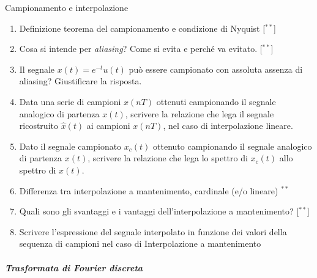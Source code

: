 \documentclass[
]{article}
\providecommand{\tightlist}{%
  \setlength{\itemsep}{0pt}\setlength{\parskip}{0pt}}
\begin{document}
Campionamento e interpolazione

\begin{enumerate}
\def\labelenumi{\arabic{enumi}.}
\setcounter{enumi}{13}
\tightlist
\item
  Definizione teorema del campionamento e condizione di Nyquist
  {[}\(^{**}\){]}
\item
  Cosa si intende per \emph{aliasing}? Come si evita e perché va
  evitato. {[}\(^{**}\){]}
\item
  Il segnale \(x(t) = e^{-t} u(t)\) può essere campionato con assoluta
  assenza di aliasing? Giustificare la risposta.
\item
  Data una serie di campioni \(x(nT)\) ottenuti campionando il segnale
  analogico di partenza \(x(t)\), scrivere la relazione che lega il
  segnale ricostruito \(\hat{x}(t)\) ai campioni \(x(nT)\), nel caso di
  interpolazione lineare.
\item
  Dato il segnale campionato \(x_c(t)\) ottenuto campionando il segnale
  analogico di partenza \(x(t)\), scrivere la relazione che lega lo
  spettro di \(x_c(t)\) allo spettro di \(x(t)\).
\item
  Differenza tra interpolazione a mantenimento, cardinale (e/o lineare)
  \(^{**}\)
\item
  Quali sono gli svantaggi e i vantaggi dell'interpolazione a
  mantenimento? {[}\(^{**}\){]}
\item
  Scrivere l'espressione del segnale interpolato in funzione dei valori
  della sequenza di campioni nel caso di Interpolazione a mantenimento
\end{enumerate}

\subparagraph{Trasformata di Fourier
discreta}\label{trasformata-di-fourier-discreta}
\end{document}
